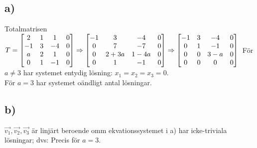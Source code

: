 \documentclass{article}
\begin{document}
\subsection*{a)}
Totalmatrisen
$T = 
\begin{bmatrix}
    2  &  1  &  1  &  0 \\
   -1  &  3  & -4  &  0 \\
    a  &  2  &  1  &  0 \\
    0  &  1  & -1  &  0 \\
\end{bmatrix}
\Rightarrow
\begin{bmatrix}
   -1  &  3  & -4  &  0 \\
    0  &  7  & -7  &  0 \\
    0  &  2+3a  &  1-4a  &  0 \\
    0  &  1  & -1  &  0 \\
\end{bmatrix}
\Rightarrow
\begin{bmatrix}
   -1  &  3  & -4  &  0 \\
    0  &  1  & -1  &  0 \\
    0  &  0  &  3-a  &  0 \\
    0  &  0  &  0  &  0 \\
\end{bmatrix}
\\
$
För $a \neq 3$ har systemet entydig lösning: $x_{1} = x_{2} = x_{3} = 0$. \\
För $a = 3$ har systemet oändligt antal lösningar.

\subsection*{b)}
$\vec{v_{1}}, \vec{v_{2}}, \vec{v_{3}}$ är linjärt beroende omm ekvationssystemet i 
a) har icke-triviala lösningar; dvs: Precis för $a = 3$.
\end{document}
